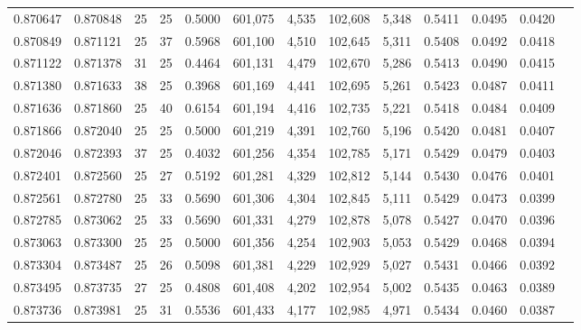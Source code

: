 \begin{tabular}{rrrrrrrrrrrrr}
0.870647 & 0.870848 &    25 &  25 &                                     0.5000 & 601,075 &   4,535 & 102,608 &   5,348 & 0.5411 & 0.0495 & 0.0420 \\
0.870849 & 0.871121 &    25 &  37 &                                     0.5968 & 601,100 &   4,510 & 102,645 &   5,311 & 0.5408 & 0.0492 & 0.0418 \\
0.871122 & 0.871378 &    31 &  25 &                                     0.4464 & 601,131 &   4,479 & 102,670 &   5,286 & 0.5413 & 0.0490 & 0.0415 \\
0.871380 & 0.871633 &    38 &  25 &                                     0.3968 & 601,169 &   4,441 & 102,695 &   5,261 & 0.5423 & 0.0487 & 0.0411 \\
0.871636 & 0.871860 &    25 &  40 &                                     0.6154 & 601,194 &   4,416 & 102,735 &   5,221 & 0.5418 & 0.0484 & 0.0409 \\
0.871866 & 0.872040 &    25 &  25 &                                     0.5000 & 601,219 &   4,391 & 102,760 &   5,196 & 0.5420 & 0.0481 & 0.0407 \\
0.872046 & 0.872393 &    37 &  25 &                                     0.4032 & 601,256 &   4,354 & 102,785 &   5,171 & 0.5429 & 0.0479 & 0.0403 \\
0.872401 & 0.872560 &    25 &  27 &                                     0.5192 & 601,281 &   4,329 & 102,812 &   5,144 & 0.5430 & 0.0476 & 0.0401 \\
0.872561 & 0.872780 &    25 &  33 &                                     0.5690 & 601,306 &   4,304 & 102,845 &   5,111 & 0.5429 & 0.0473 & 0.0399 \\
0.872785 & 0.873062 &    25 &  33 &                                     0.5690 & 601,331 &   4,279 & 102,878 &   5,078 & 0.5427 & 0.0470 & 0.0396 \\
0.873063 & 0.873300 &    25 &  25 &                                     0.5000 & 601,356 &   4,254 & 102,903 &   5,053 & 0.5429 & 0.0468 & 0.0394 \\
0.873304 & 0.873487 &    25 &  26 &                                     0.5098 & 601,381 &   4,229 & 102,929 &   5,027 & 0.5431 & 0.0466 & 0.0392 \\
0.873495 & 0.873735 &    27 &  25 &                                     0.4808 & 601,408 &   4,202 & 102,954 &   5,002 & 0.5435 & 0.0463 & 0.0389 \\
0.873736 & 0.873981 &    25 &  31 &                                     0.5536 & 601,433 &   4,177 & 102,985 &   4,971 & 0.5434 & 0.0460 & 0.0387 \\

\end{tabular}
